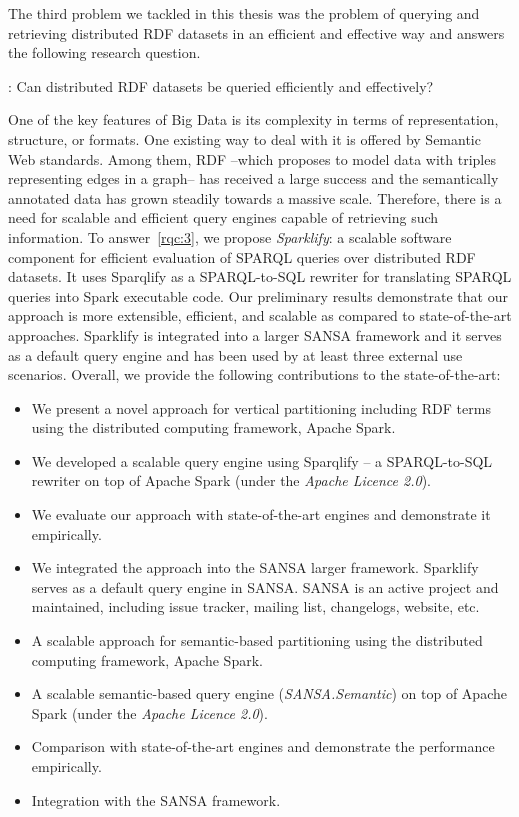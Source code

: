 The third problem we tackled in this thesis was the problem of querying and retrieving distributed RDF datasets in an efficient and effective way and answers the following research question.

\begin{tcolorbox}
\textbf{\rqNr[RQ3]\label{rqc:3}}: Can distributed RDF datasets be queried efficiently and effectively?
\end{tcolorbox}

One of the key features of Big Data is its complexity in terms of representation, structure, or formats.
One existing way to deal with it is offered by Semantic Web standards.
Among them, RDF --which proposes to model data with triples representing edges in a graph-- has received a large success and the semantically annotated data has grown steadily towards a massive scale.
Therefore, there is a need for scalable and efficient query engines capable of retrieving such information.
To answer~\ref{rqc:3}, we propose \emph{Sparklify}: a scalable software component for efficient evaluation of SPARQL queries over distributed RDF datasets. 
It uses Sparqlify as a SPARQL-to-SQL rewriter for translating SPARQL queries into Spark executable code.
Our preliminary results demonstrate that our approach is more extensible, efficient, and scalable as compared to state-of-the-art approaches.
Sparklify is integrated into a larger SANSA framework and it serves as a default query engine and has been used by at least three external use scenarios.
Overall, we provide the following contributions to the state-of-the-art:
\begin{itemize}
 \item We present a novel approach for vertical partitioning including RDF terms using the distributed computing framework, Apache Spark.
 \item We developed a scalable query engine using Sparqlify -- a SPARQL-to-SQL rewriter on top of Apache Spark (under the \textit{Apache Licence 2.0}).
 \item We evaluate our approach with state-of-the-art engines and demonstrate it empirically.
 \item We integrated the approach into the SANSA larger framework.
 Sparklify serves as a default query engine in SANSA.
 SANSA is an active project and maintained, including issue tracker, mailing list, changelogs, website, etc.
 \item A scalable approach for semantic-based partitioning using the distributed computing framework, Apache Spark.
 \item A scalable semantic-based query engine (\textit{SANSA.Semantic}) on top of Apache Spark (under the \textit{Apache Licence 2.0}).
 \item Comparison with state-of-the-art engines and demonstrate the performance empirically.
 \item Integration with the SANSA framework.
\end{itemize}


